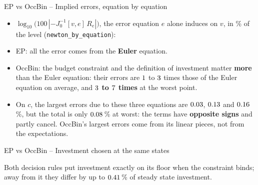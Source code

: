 \documentclass[11pt,aspectratio=169]{beamer}
\newcommand{\code}[1]{\texttt{#1}}
\begin{document}
\begin{frame}{EP vs OccBin -- Implied errors, equation by equation}

\begin{itemize}

\item $\log_{10}\bigl(100\,|{-J_0^{-1}[v,e]\,R_e}|\bigr)$, the error equation $e$ alone induces on $v$, in \% of the level (\code{newton\_by\_equation}):
\begin{center}
\scriptsize
\setlength{\tabcolsep}{4pt}
\renewcommand{\arraystretch}{0.9}

\end{center}

\item EP: all the error comes from the \textbf{Euler} equation.

\item OccBin: the budget constraint and the definition of investment matter \textbf{more} than the Euler equation: their errors are $1$ to $3$ times those of the Euler equation on average, and \textbf{$3$ to $7$ times} at the worst point.

\item On $c$, the largest errors due to these three equations are $0.03$, $0.13$ and $0.16$\,\%, but the total is only $0.08$\,\% at worst: the terms have \textbf{opposite signs} and partly cancel. OccBin's largest errors come from its linear pieces, not from the expectations.

\end{itemize}

\end{frame}

\begin{frame}{EP vs OccBin -- Investment chosen at the same states}

\begin{center}
\end{center}

\vspace*{-0.2cm}
Both decision rules put investment exactly on its floor when the constraint binds; away from it they differ by up to $0.41$\,\% of steady state investment.

\end{frame}
\end{document}
